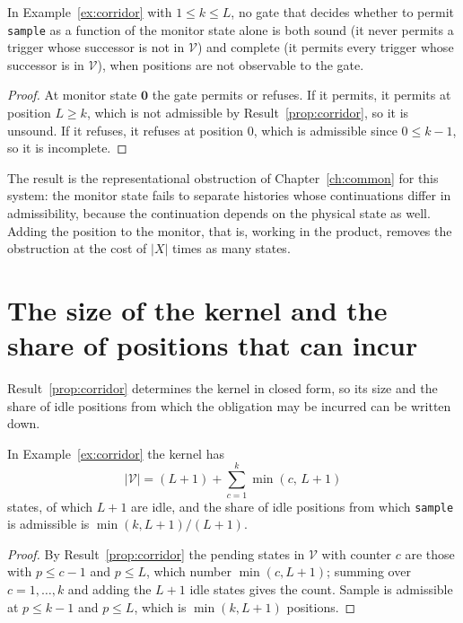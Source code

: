 \begin{newresult}\label{prop:monitor-gate}
In Example~\ref{ex:corridor} with $1\le k\le L$, no gate that decides whether to permit \texttt{sample} as a function of the monitor state alone is both sound (it never permits a trigger whose successor is not in $\mathcal V$) and complete (it permits every trigger whose successor is in $\mathcal V$), when positions are not observable to the gate.
\end{newresult}
\begin{proof}
At monitor state $\mathbf 0$ the gate permits or refuses. If it permits, it permits at position $L\ge k$, which is not admissible by Result~\ref{prop:corridor}, so it is unsound. If it refuses, it refuses at position $0$, which is admissible since $0\le k-1$, so it is incomplete.
\end{proof}

The result is the representational obstruction of Chapter~\ref{ch:common} for this system: the monitor state fails to separate histories whose continuations differ in admissibility, because the continuation depends on the physical state as well. Adding the position to the monitor, that is, working in the product, removes the obstruction at the cost of $|X|$ times as many states.


\section[Size of the corridor kernel]{The size of the kernel and the share of positions that can incur}\label{sec:corridor-count}

Result~\ref{prop:corridor} determines the kernel in closed form, so its size and the share of idle positions from which the obligation may be incurred can be written down.

\begin{newresult}\label{prop:corridor-count}
In Example~\ref{ex:corridor} the kernel has
\[
|\mathcal V|=(L+1)+\sum_{c=1}^{k}\min(c,\,L+1)
\]
states, of which $L+1$ are idle, and the share of idle positions from which \texttt{sample} is admissible is $\min(k,L+1)/(L+1)$.
\end{newresult}
\begin{proof}
By Result~\ref{prop:corridor} the pending states in $\mathcal V$ with counter $c$ are those with $p\le c-1$ and $p\le L$, which number $\min(c,L+1)$; summing over $c=1,\dots,k$ and adding the $L+1$ idle states gives the count. Sample is admissible at $p\le k-1$ and $p\le L$, which is $\min(k,L+1)$ positions.
\end{proof}

